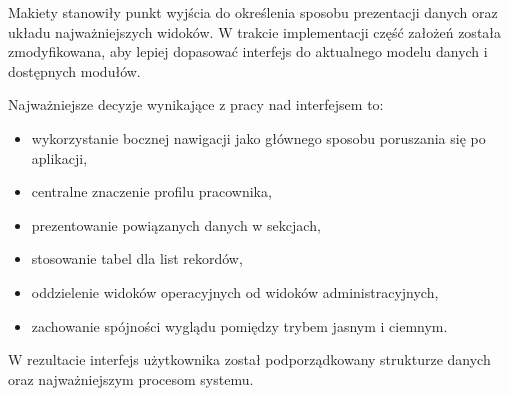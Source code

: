 Makiety stanowiły punkt wyjścia do określenia sposobu prezentacji danych oraz układu najważniejszych widoków. W trakcie implementacji część założeń została zmodyfikowana, aby lepiej dopasować interfejs do aktualnego modelu danych i dostępnych modułów.

Najważniejsze decyzje wynikające z pracy nad interfejsem to:
\begin{itemize}
    \item wykorzystanie bocznej nawigacji jako głównego sposobu poruszania się po aplikacji,
    \item centralne znaczenie profilu pracownika,
    \item prezentowanie powiązanych danych w sekcjach,
    \item stosowanie tabel dla list rekordów,
    \item oddzielenie widoków operacyjnych od widoków administracyjnych,
    \item zachowanie spójności wyglądu pomiędzy trybem jasnym i ciemnym.
\end{itemize}

W rezultacie interfejs użytkownika został podporządkowany strukturze danych oraz najważniejszym procesom systemu.